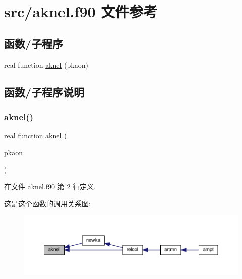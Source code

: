 \hypertarget{aknel_8f90}{}\section{src/aknel.f90 文件参考}
\label{aknel_8f90}
\subsection*{函数/子程序}
\begin{DoxyCompactItemize}
\item 
real function \mbox{\hyperlink{aknel_8f90_ad50e67ad83163ea3ae525a9c456c295c}{aknel}} (pkaon)
\end{DoxyCompactItemize}


\subsection{函数/子程序说明}
\mbox{\label{aknel_8f90_ad50e67ad83163ea3ae525a9c456c295c}} 
\subsubsection{\texorpdfstring{aknel()}{aknel()}}
{\footnotesize\ttfamily real function aknel (\begin{DoxyParamCaption}\item[{}]{pkaon }\end{DoxyParamCaption})}



在文件 aknel.\+f90 第 2 行定义.

这是这个函数的调用关系图\+:
\nopagebreak
\begin{figure}[H]
\begin{center}
\leavevmode
\includegraphics[width=350pt]{aknel_8f90_ad50e67ad83163ea3ae525a9c456c295c_icgraph}
\end{center}
\end{figure}
